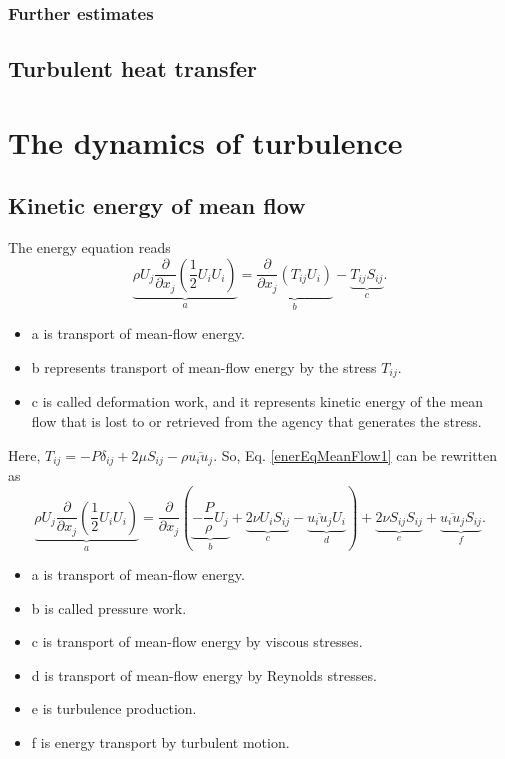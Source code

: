 \documentclass[review]{elsarticle}
\numberwithin{equation}{section}
\begin{document}
	\subsubsection{Further estimates}
	\subsection{Turbulent heat transfer}

\section{The dynamics of turbulence}
	\subsection{Kinetic energy of mean flow}
		The energy equation reads
		\begin{equation}\label{enerEqMeanFlow1}
			\underbrace {\rho U_j\frac{\partial}{\partial x_j}(\frac{1}{2}U_iU_i)}_{a}=\underbrace {\frac{\partial}{\partial x_j}(T_{ij}U_i)}_{b} 
			- \underbrace {T_{ij}S_{ij}}_{c}.
		\end{equation}
		\begin{itemize}
			\item a is transport of mean-flow energy.
			\item b represents transport of mean-flow energy by the stress $T_{ij}$. 
			\item c is called deformation work, and it represents kinetic energy of the mean flow that is lost to or retrieved from the agency 
			that generates the stress.
		\end{itemize}
		Here, $T_{ij} = -P\delta_{ij}+2\mu S_{ij} - \rho \overline{u_iu_j}$. So, Eq. \ref{enerEqMeanFlow1} can be rewritten as 
		\begin{equation}\label{enerEqMeanFlow2}
			\underbrace {\rho U_j\frac{\partial}{\partial x_j}(\frac{1}{2}U_iU_i)}_{a}=
			\frac{\partial}{\partial x_j}(
				\underbrace{-\frac{P}{\rho}U_j}_b + 
				\underbrace{2\nu U_iS_{ij}}_c - 
				\underbrace{\overline{u_iu_j}U_i}_d
			) +	\underbrace {2\nu S_{ij}S_{ij}}_{e} + \underbrace{\overline{u_iu_j}S_{ij}}_f. 
		\end{equation}
		\begin{itemize}
			\item a is transport of mean-flow energy.
			\item b is called pressure work.
			\item c is transport of mean-flow energy by viscous stresses.
			\item d is transport of mean-flow energy by Reynolds stresses.
			\item e is turbulence production.
			\item f is energy transport by turbulent motion.
		\end{itemize}
\end{document}
